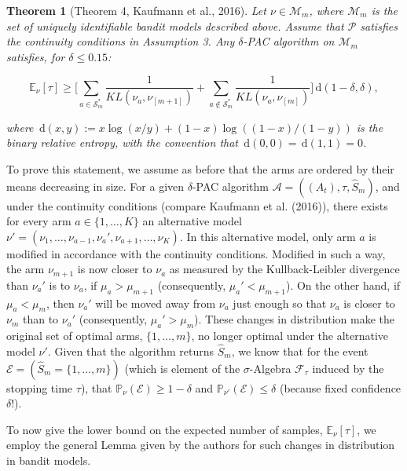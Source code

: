 \documentclass[12pt,]{article}
\newtheorem{theorem}{Theorem}
\newcommand{\der}{\,\text{d}}
\begin{document}
\begin{theorem}[Theorem 4, Kaufmann et al., 2016] \label{theorem:KaufmannEtAlTheorem4}
Let $\nu \in \mathcal{M}_m$, where $\mathcal{M}_m$ is the set of uniquely identifiable bandit models described above. Assume that $\mathcal{P}$ satisfies the continuity conditions in Assumption 3. Any $\delta$-PAC algorithm on $\mathcal{M}_m$ satisfies, for $\delta \leq 0.15$:

\begin{equation*}
\mathbb{E}_{\nu}[\tau] \geq \Big[ \sum_{a \in \mathcal{S}^*_m} \frac{1}{KL(\nu_a, \nu_{[m+1]})} + \sum_{a \notin \mathcal{S}^*_m} \frac{1}{KL(\nu_a, \nu_{[m]})} \Big] \der(1-\delta, \delta),
\end{equation*}

where $\der(x,y) := x \log(x/y) + (1-x) \log((1-x)/(1-y))$ is the binary relative entropy, with the convention that $\der(0,0) = \der(1,1) = 0$.
\end{theorem}

To prove this statement, we assume as before that the arms are ordered
by their means decreasing in size. For a given \(\delta\)-PAC algorithm
\(\mathcal{A} = ((A_t), \tau, \hat{S}_m)\), and under the continuity
conditions (compare Kaufmann et al. (2016)), there exists for every arm
\(a \in \{1, \dots, K\}\) an alternative model
\(\nu' = (\nu_1, \dots, \nu_{a-1}, \nu_a', \nu_{a+1}, \dots, \nu_K)\).
In this alternative model, only arm \(a\) is modified in accordance with
the continuity conditions. Modified in such a way, the arm \(\nu_{m+1}\)
is now closer to \(\nu_a\) as measured by the Kullback-Leibler
divergence than \(\nu_a'\) is to \(\nu_a\), if \(\mu_a > \mu_{m+1}\)
(consequently, \(\mu_a' < \mu_{m+1}\)). On the other hand, if
\(\mu_a < \mu_{m}\), then \(\nu_a'\) will be moved away from \(\nu_a\)
just enough so that \(\nu_a\) is closer to \(\nu_m\) than to \(\nu_a'\)
(consequently, \(\mu_a' > \mu_m\)). These changes in distribution make
the original set of optimal arms, \(\{1,\dots,m\}\), no longer optimal
under the alternative model \(\nu'\). Given that the algorithm returns
\(\hat{S}_m\), we know that for the event
\(\mathcal{E} = (\hat{S}_m = \{1, \dots, m\})\) (which is element of the
\(\sigma\)-Algebra \(\mathcal{F}_{\tau}\) induced by the stopping time
\(\tau\)), that \(\mathbb{P}_{\nu}(\mathcal{E}) \geq 1-\delta\) and
\(\mathbb{P}_{\nu'}(\mathcal{E}) \leq \delta\) (because fixed confidence
\(\delta\)!).

To now give the lower bound on the expected number of samples,
\(\mathbb{E}_{\nu}[\tau]\), we employ the general Lemma given by the
authors for such changes in distribution in bandit models.
\end{document}
